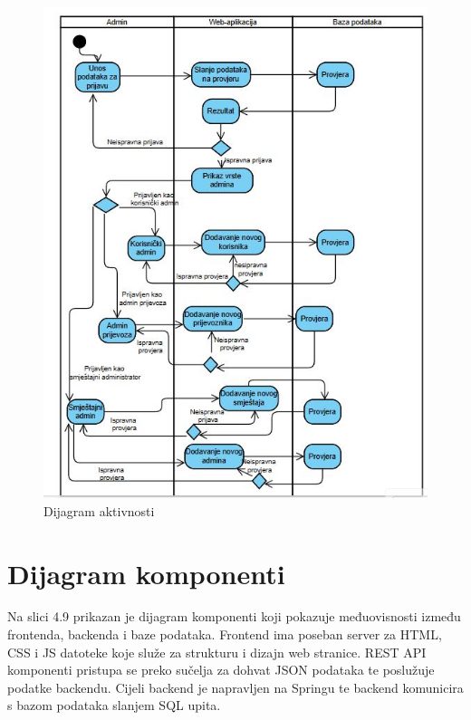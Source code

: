 		\begin{figure}[H]
			\includegraphics[width=\linewidth]{slike/Dijagram aktivnsti.JPG}
			\centering
			\caption{Dijagram aktivnosti}
			\label{fig:Dijagram aktivnosti}
		\end{figure}


			
			
			\eject
		\section{Dijagram komponenti}

		{Na slici 4.9 prikazan je dijagram komponenti koji pokazuje međuovisnosti između frontenda, backenda i baze podataka. Frontend ima poseban server za HTML, CSS i JS datoteke koje služe za strukturu i dizajn web stranice. REST API komponenti pristupa se preko sučelja za dohvat JSON podataka te poslužuje podatke backendu. 
		Cijeli backend je napravljen na Springu te backend komunicira s bazom podataka slanjem SQL upita.}
		
